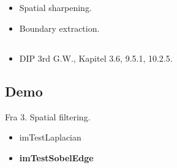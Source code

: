 \subsection{\subtopics}

\begin{itemize}
	\item Spatial sharpening.
	\item Boundary extraction.
\end{itemize}

\subsection{\curriculum}

\begin{itemize}
	\item DIP 3rd G.W., Kapitel 3.6, 9.5.1, 10.2.5.
\end{itemize}

\subsection{Demo}

Fra 3. Spatial filtering.

\begin{itemize}
	\item imTestLaplacian
	\item \textbf{imTestSobelEdge}
\end{itemize}
